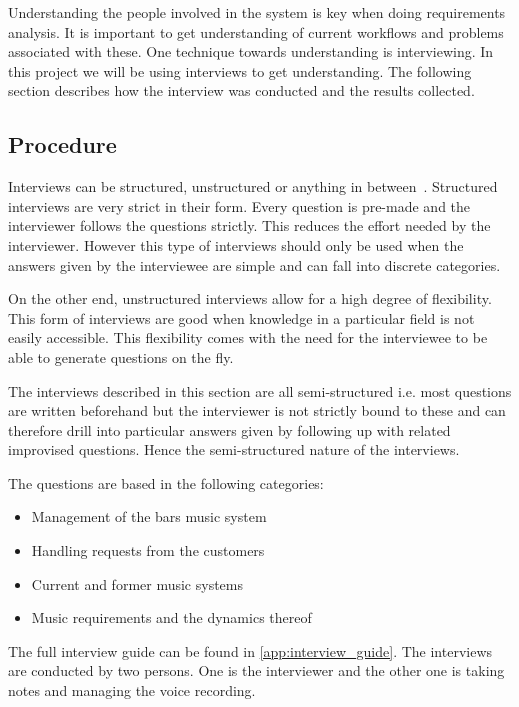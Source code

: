 \label{interviews}

Understanding the people involved in the system is key when doing requirements analysis. It is important to get understanding of current workflows and problems associated with these. One technique towards understanding is interviewing. In this project we will be using interviews to get understanding. The following section describes how the interview was conducted and the results collected.

\subsection{Procedure}
\label{sub:procedure}

Interviews can be structured, unstructured or anything in between~\cite{benyon2013designing}. Structured interviews are very strict in their form. Every question is pre-made and the interviewer follows the questions strictly. This reduces the effort needed by the interviewer. However this type of interviews should only be used when the answers given by the interviewee are simple and can fall into discrete categories. 

On the other end, unstructured interviews allow for a high degree of flexibility. This form of interviews are good when knowledge in a particular field is not easily accessible. This flexibility comes with the need for the interviewee to be able to generate questions on the fly.

The interviews described in this section are all semi-structured i.e. most questions are written beforehand but the interviewer is not strictly bound to these and can therefore drill into particular answers given by following up with related improvised questions. Hence the semi-structured nature of the interviews.

The questions are based in the following categories:

\begin{itemize}
  \item Management of the bars music system
  \item Handling requests from the customers
  \item Current and former music systems
  \item Music requirements and the dynamics thereof
\end{itemize}

The full interview guide can be found in \cref{app:interview_guide}. The interviews are conducted by two persons. One is the interviewer and the other one is taking notes and managing the voice recording.

